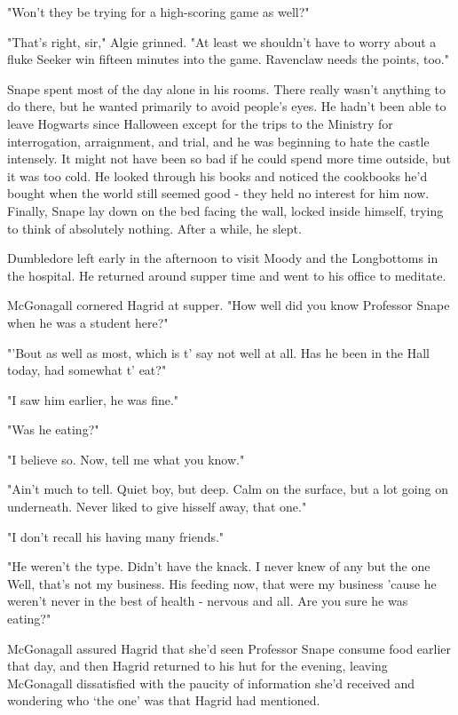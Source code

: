 "Won't they be trying for a high-scoring game as well?"

"That's right, sir," Algie grinned. "At least we shouldn't have to worry about a fluke Seeker win fifteen minutes into the game. Ravenclaw needs the points, too."

Snape spent most of the day alone in his rooms. There really wasn't anything to do there, but he wanted primarily to avoid people's eyes. He hadn't been able to leave Hogwarts since Halloween except for the trips to the Ministry for interrogation, arraignment, and trial, and he was beginning to hate the castle intensely. It might not have been so bad if he could spend more time outside, but it was too cold. He looked through his books and noticed the cookbooks he'd bought when the world still seemed good - they held no interest for him now. Finally, Snape lay down on the bed facing the wall, locked inside himself, trying to think of absolutely nothing. After a while, he slept.

Dumbledore left early in the afternoon to visit Moody and the Longbottoms in the hospital. He returned around supper time and went to his office to meditate.

McGonagall cornered Hagrid at supper. "How well did you know Professor Snape when he was a student here?"

"'Bout as well as most, which is t' say not well at all. Has he been in the Hall today, had somewhat t' eat?"

"I saw him earlier, he was fine."

"Was he eating?"

"I believe so. Now, tell me what you know."

"Ain't much to tell. Quiet boy, but deep. Calm on the surface, but a lot going on underneath. Never liked to give hisself away, that one."

"I don't recall his having many friends."

"He weren't the type. Didn't have the knack. I never knew of any but the one{\el} Well, that's not my business. His feeding now, that were my business 'cause he weren't never in the best of health - nervous and all. Are you sure he was eating?"

McGonagall assured Hagrid that she'd seen Professor Snape consume food earlier that day, and then Hagrid returned to his hut for the evening, leaving McGonagall dissatisfied with the paucity of information she'd received and wondering who `the one' was that Hagrid had mentioned.

